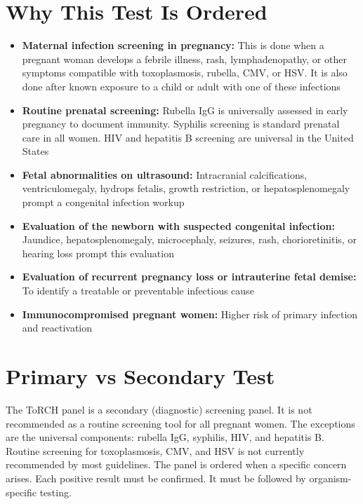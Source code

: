 \section*{Why This Test Is Ordered}
\begin{itemize}
  \item \textbf{Maternal infection screening in pregnancy:} This is done when a pregnant woman develops a febrile illness, rash, lymphadenopathy, or other symptoms compatible with toxoplasmosis, rubella, CMV, or HSV. It is also done after known exposure to a child or adult with one of these infections
  \item \textbf{Routine prenatal screening:} Rubella IgG is universally assessed in early pregnancy to document immunity. Syphilis screening is standard prenatal care in all women. HIV and hepatitis B screening are universal in the United States
  \item \textbf{Fetal abnormalities on ultrasound:} Intracranial calcifications, ventriculomegaly, hydrops fetalis, growth restriction, or hepatosplenomegaly prompt a congenital infection workup
  \item \textbf{Evaluation of the newborn with suspected congenital infection:} Jaundice, hepatosplenomegaly, microcephaly, seizures, rash, chorioretinitis, or hearing loss prompt this evaluation
  \item \textbf{Evaluation of recurrent pregnancy loss or intrauterine fetal demise:} To identify a treatable or preventable infectious cause
  \item \textbf{Immunocompromised pregnant women:} Higher risk of primary infection and reactivation
\end{itemize}

\section*{Primary vs Secondary Test}
The ToRCH panel is a secondary (diagnostic) screening panel. It is not recommended as a routine screening tool for all pregnant women. The exceptions are the universal components: rubella IgG, syphilis, HIV, and hepatitis B. Routine screening for toxoplasmosis, CMV, and HSV is not currently recommended by most guidelines. The panel is ordered when a specific concern arises. Each positive result must be confirmed. It must be followed by organism-specific testing.

